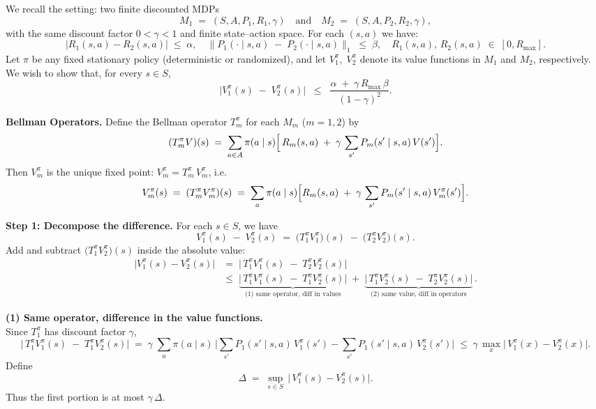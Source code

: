 We recall the setting: two finite discounted MDPs
\[
  M_1 \;=\; (S,A,P_1,R_1,\gamma)
  \quad\text{and}\quad
  M_2 \;=\;(S,A,P_2,R_2,\gamma),
\]
with the same discount factor $0<\gamma<1$ and finite state--action space. 
For each $(s,a)$ we have:
\[
  \bigl|R_1(s,a)-R_2(s,a)\bigr|\;\le\;\alpha,
  \quad
  \bigl\|P_1(\cdot\mid s,a)\;-\;P_2(\cdot\mid s,a)\bigr\|_1\;\le\;\beta,
  \quad
  R_1(s,a),\,R_2(s,a)\;\in\;[0,R_{\max}].
\]
Let $\pi$ be any fixed stationary policy (deterministic or randomized), and let 
$V^\pi_1,\;V^\pi_2$ denote its value functions in $M_1$ and $M_2$, respectively. 
We wish to show that, for every $s\in S$,
\[
  \bigl|V_1^\pi(s)\;-\;V_2^\pi(s)\bigr|
  \;\;\le\;\;
  \frac{\alpha\;+\;\gamma\,R_{\max}\,\beta}{(1-\gamma)^2}.
\]

\medskip
\noindent
\textbf{Bellman Operators.} 
Define the Bellman operator $T_m^\pi$ for each $M_m$ ($m=1,2$) by
\[
  (T_m^\pi V)(s)
  \;=\;
  \sum_{a\in A}\pi(a\mid s)
  \Bigl[\,R_m(s,a)\;+\;\gamma\,\sum_{s'}P_m(s'\mid s,a)\,V(s')\Bigr].
\]
Then $V_m^\pi$ is the unique fixed point: $V_m^\pi = T_m^\pi\,V_m^\pi$, i.e.
\[
  V_m^\pi(s)
  \;=\;
  (T_m^\pi V_m^\pi)(s)
  \;=\;
  \sum_{a}\pi(a\mid s)
  \Bigl[R_m(s,a)
        \;+\;\gamma\,\sum_{s'}P_m(s'\mid s,a)\,V_m^\pi(s')\Bigr].
\]

\medskip
\noindent
\textbf{Step 1: Decompose the difference.}  
For each $s\in S$, we have
\[
  V_1^\pi(s)\;-\;V_2^\pi(s)
  \;=\;
  \bigl(T_1^\pi V_1^\pi\bigr)(s)\;-\;\bigl(T_2^\pi V_2^\pi\bigr)(s).
\]
Add and subtract $\bigl(T_1^\pi V_2^\pi\bigr)(s)$ inside the absolute value:
\[
  \begin{aligned}
  \bigl|V_1^\pi(s)-V_2^\pi(s)\bigr|
  &=\;
  \bigl|\,T_1^\pi V_1^\pi(s)\;-\;T_2^\pi V_2^\pi(s)\bigr|
  \\
  &\le\;
  \underbrace{\bigl|\,T_1^\pi V_1^\pi(s)\;-\;T_1^\pi V_2^\pi(s)\bigr|}%
            _{\text{(1) same operator, diff in values}}
  \;+\;
  \underbrace{\bigl|\,T_1^\pi V_2^\pi(s)\;-\;T_2^\pi V_2^\pi(s)\bigr|}%
             _{\text{(2) same value, diff in operators}}
  \,.
  \end{aligned}
\]

\smallskip
\noindent
\textbf{(1) Same operator, difference in the value functions.}\\
Since $T_1^\pi$ has discount factor $\gamma$,
\[
  \bigl|\,T_1^\pi V_1^\pi(s) \;-\;T_1^\pi V_2^\pi(s)\bigr|
  \;=\;
  \gamma\;\sum_{a}\pi(a\mid s)\,
  \bigl|\sum_{s'}P_1(s'\mid s,a)\,V_1^\pi(s')
         -\sum_{s'}P_1(s'\mid s,a)\,V_2^\pi(s')
  \bigr|
  \;\le\;
  \gamma\,\max_{x}\bigl|\,V_1^\pi(x)-V_2^\pi(x)\bigr|.
\]
Define 
\[
  \Delta\;=\;\sup_{s\in S}\,\bigl|\,V_1^\pi(s)-V_2^\pi(s)\bigr|.
\]
Thus the first portion is at most $\gamma\,\Delta$.


